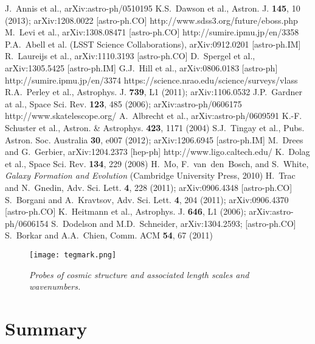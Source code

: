 \begin{thebibliography}{99}
 J.~Annis et al., arXiv:astro-ph/0510195
 K.S.~Dawson et al., Astron. J. {\bf 145}, 10 (2013);
  arXiv:1208.0022 [astro-ph.CO]
 http://www.sdss3.org/future/eboss.php
 M.~Levi et al., arXiv:1308.08471 [astro-ph.CO]
 http://sumire.ipmu.jp/en/3358
 P.A.~Abell et al. (LSST Science Collaborations),
  arXiv:0912.0201 [astro-ph.IM]
 R.~Laureijs et al., arXiv:1110.3193 [astro-ph.CO]
 D.~Spergel et al., arXiv:1305.5425 [astro-ph.IM]
 G.J.~Hill et al., arXiv:0806.0183 [astro-ph]
 http://sumire.ipmu.jp/en/3374
 https://science.nrao.edu/science/surveys/vlass
 R.A.~Perley et al., Astrophys. J. {\bf 739}, L1 (2011);
  arXiv:1106.0532
 J.P.~Gardner at al., Space Sci. Rev. {\bf 123}, 485
  (2006); arXiv:astro-ph/0606175
 http://www.skatelescope.org/
 A.~Albrecht et al., arXiv:astro-ph/0609591
 K.-F. Schuster et al., Astron. \& Astrophys. {\bf 423},
    1171 (2004)
 S.J.~Tingay et al., Pubs. Astron. Soc. Australia {\bf
    30}, e007 (2012); arXiv:1206.6945 [astro-ph.IM]
 M.~Drees and G.~Gerbier, arXiv:1204.2373 [hep-ph]
 http://www.ligo.caltech.edu/
 K.~Dolag et al., Space Sci. Rev. {\bf 134}, 229 (2008)
 H.~Mo, F.~van~den~Bosch, and S.~White, {\em Galaxy
    Formation and Evolution} (Cambridge University Press, 2010)
 H.~Trac and N.~Gnedin, Adv. Sci. Lett. {\bf 4}, 228
  (2011); arXiv:0906.4348 [astro-ph.CO]
 S.~Borgani and A.~Kravtsov, Adv. Sci. Lett. {\bf
    4}, 204 (2011); arXiv:0906.4370 [astro-ph.CO]
 K.~Heitmann et al., Astrophys. J. {\bf 646}, L1 (2006);
  arXiv:astro-ph/0606154 
 S.~Dodelson and M.D.~Schneider, arXiv:1304.2593;
[astro-ph.CO] 
 S.~Borkar and A.A.~Chien, Comm. ACM {\bf 54}, 67
  (2011) 
\end{thebibliography}






%


\begin{wrapfigure}[18]{r}{2.8in}
  \centering \texttt{[image: tegmark.png]}

\vspace{-0.2cm}

  \caption{\small{\em Probes of cosmic structure and associated length
      scales and wavenumbers.}}
\label{tegmark}
\end{wrapfigure}




\section{Summary}
\label{sec:comp-summary}




